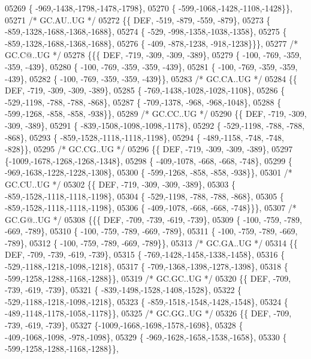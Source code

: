 \begin{DoxyCode}
05269 \{ -969,-1438,-1798,-1478,-1798\},
05270 \{ -599,-1068,-1428,-1108,-1428\}\},
05271 \textcolor{comment}{/* GC.AU..UG */}
05272 \{\{  DEF, -519, -879, -559, -879\},
05273 \{ -859,-1328,-1688,-1368,-1688\},
05274 \{ -529, -998,-1358,-1038,-1358\},
05275 \{ -859,-1328,-1688,-1368,-1688\},
05276 \{ -409, -878,-1238, -918,-1238\}\}\},
05277 \textcolor{comment}{/* GC.C@..UG */}
05278 \{\{\{  DEF, -719, -309, -309, -389\},
05279 \{ -100, -769, -359, -359, -439\},
05280 \{ -100, -769, -359, -359, -439\},
05281 \{ -100, -769, -359, -359, -439\},
05282 \{ -100, -769, -359, -359, -439\}\},
05283 \textcolor{comment}{/* GC.CA..UG */}
05284 \{\{  DEF, -719, -309, -309, -389\},
05285 \{ -769,-1438,-1028,-1028,-1108\},
05286 \{ -529,-1198, -788, -788, -868\},
05287 \{ -709,-1378, -968, -968,-1048\},
05288 \{ -599,-1268, -858, -858, -938\}\},
05289 \textcolor{comment}{/* GC.CC..UG */}
05290 \{\{  DEF, -719, -309, -309, -389\},
05291 \{ -839,-1508,-1098,-1098,-1178\},
05292 \{ -529,-1198, -788, -788, -868\},
05293 \{ -859,-1528,-1118,-1118,-1198\},
05294 \{ -489,-1158, -748, -748, -828\}\},
05295 \textcolor{comment}{/* GC.CG..UG */}
05296 \{\{  DEF, -719, -309, -309, -389\},
05297 \{-1009,-1678,-1268,-1268,-1348\},
05298 \{ -409,-1078, -668, -668, -748\},
05299 \{ -969,-1638,-1228,-1228,-1308\},
05300 \{ -599,-1268, -858, -858, -938\}\},
05301 \textcolor{comment}{/* GC.CU..UG */}
05302 \{\{  DEF, -719, -309, -309, -389\},
05303 \{ -859,-1528,-1118,-1118,-1198\},
05304 \{ -529,-1198, -788, -788, -868\},
05305 \{ -859,-1528,-1118,-1118,-1198\},
05306 \{ -409,-1078, -668, -668, -748\}\}\},
05307 \textcolor{comment}{/* GC.G@..UG */}
05308 \{\{\{  DEF, -709, -739, -619, -739\},
05309 \{ -100, -759, -789, -669, -789\},
05310 \{ -100, -759, -789, -669, -789\},
05311 \{ -100, -759, -789, -669, -789\},
05312 \{ -100, -759, -789, -669, -789\}\},
05313 \textcolor{comment}{/* GC.GA..UG */}
05314 \{\{  DEF, -709, -739, -619, -739\},
05315 \{ -769,-1428,-1458,-1338,-1458\},
05316 \{ -529,-1188,-1218,-1098,-1218\},
05317 \{ -709,-1368,-1398,-1278,-1398\},
05318 \{ -599,-1258,-1288,-1168,-1288\}\},
05319 \textcolor{comment}{/* GC.GC..UG */}
05320 \{\{  DEF, -709, -739, -619, -739\},
05321 \{ -839,-1498,-1528,-1408,-1528\},
05322 \{ -529,-1188,-1218,-1098,-1218\},
05323 \{ -859,-1518,-1548,-1428,-1548\},
05324 \{ -489,-1148,-1178,-1058,-1178\}\},
05325 \textcolor{comment}{/* GC.GG..UG */}
05326 \{\{  DEF, -709, -739, -619, -739\},
05327 \{-1009,-1668,-1698,-1578,-1698\},
05328 \{ -409,-1068,-1098, -978,-1098\},
05329 \{ -969,-1628,-1658,-1538,-1658\},
05330 \{ -599,-1258,-1288,-1168,-1288\}\},

\end{DoxyCode}
